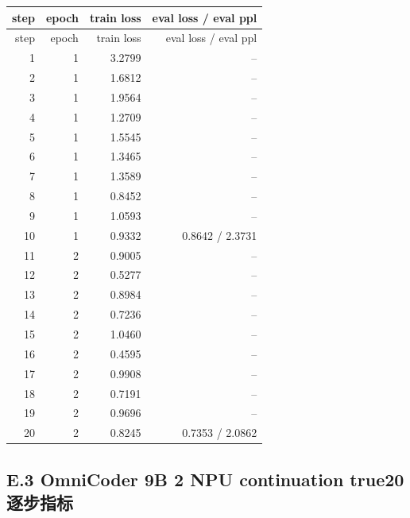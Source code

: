 \documentclass[11pt,a4paper]{article}
\begin{document}
\small
\begin{longtable}{r r r r}
\toprule
step & epoch & train loss & eval loss / eval ppl \\
\midrule
\endfirsthead
\toprule
step & epoch & train loss & eval loss / eval ppl \\
\midrule
\endhead
1 & 1 & 3.2799 & -- \\
2 & 1 & 1.6812 & -- \\
3 & 1 & 1.9564 & -- \\
4 & 1 & 1.2709 & -- \\
5 & 1 & 1.5545 & -- \\
6 & 1 & 1.3465 & -- \\
7 & 1 & 1.3589 & -- \\
8 & 1 & 0.8452 & -- \\
9 & 1 & 1.0593 & -- \\
10 & 1 & 0.9332 & 0.8642 / 2.3731 \\
11 & 2 & 0.9005 & -- \\
12 & 2 & 0.5277 & -- \\
13 & 2 & 0.8984 & -- \\
14 & 2 & 0.7236 & -- \\
15 & 2 & 1.0460 & -- \\
16 & 2 & 0.4595 & -- \\
17 & 2 & 0.9908 & -- \\
18 & 2 & 0.7191 & -- \\
19 & 2 & 0.9696 & -- \\
20 & 2 & 0.8245 & 0.7353 / 2.0862 \\
\bottomrule
\end{longtable}
\normalsize

\subsection{E.3 OmniCoder 9B 2 NPU continuation true20 逐步指标}
\end{document}
